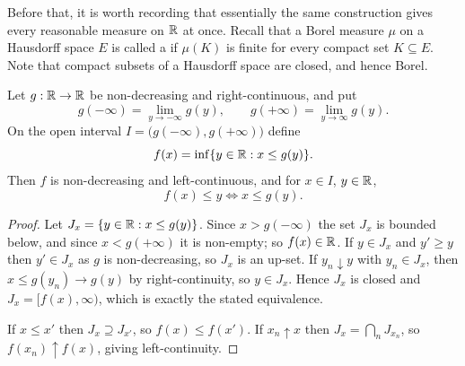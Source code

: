\documentclass[a4paper]{scrartcl}
\begin{document}
Before that, it is worth recording that essentially the same construction gives every reasonable measure on $\mathbb{R}$ at once. Recall that a Borel measure $\mu$ on a Hausdorff space $E$ is called a  if $\mu(K)$ is finite for every compact set $K \subseteq E$. Note that compact subsets of a Hausdorff space are closed, and hence Borel.

\begin{lemma}\label{lem:gen-inverse}
	Let $g : \mathbb{R} \to \mathbb{R}$ be non-decreasing and right-continuous, and put
	$$
	g(-\infty) = \lim_{y \to -\infty} g(y), \qquad g(+\infty) = \lim_{y\to\infty}g(y).
	$$
	On the open interval $I = \big(g(-\infty), g(+\infty)\big)$ define
	$$
	f(x) = \inf\{ y \in \mathbb{R} : x \leq g(y)\}.
	$$
	Then $f$ is non-decreasing and left-continuous, and for $x \in I$, $y \in \mathbb{R}$,
	$$
	f(x) \leq y \iff x \leq g(y).
	$$
\end{lemma}
\begin{proof}
	Let $J_x = \{y \in \mathbb{R} : x \leq g(y)\}$. Since $x > g(-\infty)$ the set $J_x$ is bounded below, and since $x < g(+\infty)$ it is non-empty; so $f(x) \in \mathbb{R}$. If $y \in J_x$ and $y' \geq y$ then $y' \in J_x$ as $g$ is non-decreasing, so $J_x$ is an up-set. If $y_n \downarrow y$ with $y_n \in J_x$, then $x \leq g(y_n) \to g(y)$ by right-continuity, so $y \in J_x$. Hence $J_x$ is closed and $J_x = [f(x), \infty)$, which is exactly the stated equivalence.

	If $x \leq x'$ then $J_{x} \supseteq J_{x'}$, so $f(x) \leq f(x')$. If $x_n \uparrow x$ then $J_x = \bigcap_n J_{x_n}$, so $f(x_n) \uparrow f(x)$, giving left-continuity.
\end{proof}
\end{document}
